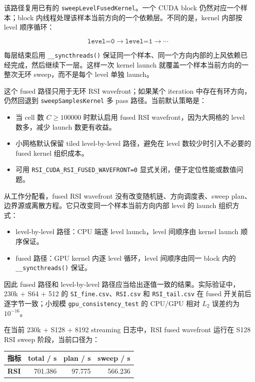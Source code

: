\documentclass[10pt]{article}
\newcommand{\code}[1]{\texttt{#1}}
\begin{document}
该路径复用已有的 \code{sweepLevelFusedKernel}。一个 CUDA block 仍然对应一个样本；block 内线程处理该样本当前方向的一个依赖层。不同的是，kernel 内部按 level 顺序循环：

\[
\code{level=0} \rightarrow \code{level=1} \rightarrow \cdots
\]

每层结束后用 \code{\_\_syncthreads()} 保证同一个样本、同一个方向内部的上风依赖已经完成，然后继续下一层。这样一次 kernel launch 就覆盖一个样本当前方向的一整次无环 sweep，而不是每个 level 单独 launch。

这个 fused 路径只用于无环 RSI wavefront；如果某个 iteration 中存在有环方向，仍然回退到 \code{sweepSamplesKernel} 多 pass 路径。当前默认策略是：

\begin{itemize}
\item 当 cell 数 $C \ge 100000$ 时默认启用 fused RSI wavefront，因为大网格的 level 数多，减少 launch 数更有收益。
\item 小网格默认保留 tiled level-by-level 路径，避免在 level 数较少时引入不必要的 fused kernel 组织成本。
\item 可用 \code{RSI\_CUDA\_RSI\_FUSED\_WAVEFRONT=0} 显式关闭，便于定位性能或数值问题。
\end{itemize}

从工作分配看，fused RSI wavefront 没有改变随机链、方向调度表、sweep plan、边界源或离散方程。它只改变同一个样本当前方向内部 level 的 launch 组织方式：

\begin{itemize}
\item level-by-level 路径：CPU 端逐 level launch，level 间顺序由 kernel launch 顺序保证。
\item fused 路径：GPU kernel 内逐 level 循环，level 间顺序由同一 block 内的 \code{\_\_syncthreads()} 保证。
\end{itemize}

因此 fused 路径和 level-by-level 路径应当给出逐值一致的结果。实际验证中，230k + S64 + 512 的 \code{SI\_fine.csv}、\code{RSI.csv} 和 \code{RSI\_tail.csv} 在 fused 开关前后逐字节一致；小规模 \code{gpu\_consistency\_test} 的 CPU/GPU 相对 $L_2$ 误差约为 $10^{-16}$。

在当前 230k + S128 + 8192 streaming 日志中，RSI fused wavefront 运行在 S128 RSI sweep 阶段，当前口径为：

\begin{tabularx}{\linewidth}{>{\bfseries}l r r r}
\toprule
指标 & total / s & plan / s & sweep / s\\
\midrule
\rowcolor{softrow}
RSI & 701.386 & 97.775 & 566.236\\
\bottomrule
\end{tabularx}
\end{document}
